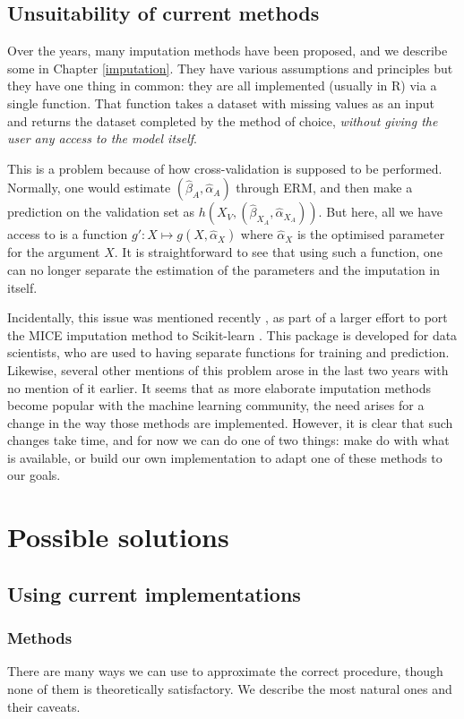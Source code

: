 \documentclass[12pt, a4paper]{memoir}
\begin{document}
		\subsection{Unsuitability of current methods}
Over the years, many imputation methods have been proposed, and we describe some in Chapter \ref{imputation}. They have various assumptions and principles but they have one thing in common: they are all implemented (usually in R) via a single function. That function takes a dataset with missing values as an input and returns the dataset completed by the method of choice, \emph{without giving the user any access to the model itself}.

This is a problem because of how cross-validation is supposed to be performed. Normally, one would estimate $(\hat{\beta}_A, \hat{\alpha}_A)$ through ERM, and then make a prediction on the validation set as $h(X_V,(\hat{\beta}_{X_A},\hat{\alpha}_{X_A}))$. But here, all we have access to is a function $g': X \mapsto g(X, \hat{\alpha}_X)$ where $\hat{\alpha}_X$ is the optimised parameter for the argument $X$. It is straightforward to see that using such a function, one can no longer separate the estimation of the parameters and the imputation in itself.
	
Incidentally, this issue was mentioned recently \cite{github_sklearn}, as part of a larger effort to port the MICE \cite{MICE_founding} imputation method to Scikit-learn \cite{scikit-learn}. This package is developed for data scientists, who are used to having separate functions for training and prediction. Likewise, several other mentions of this problem arose in the last two years \cite{thread_newdata1}\cite{thread_newdata2}\cite{thread_newdata3} with no mention of it earlier. It seems that as more elaborate imputation methods become popular with the machine learning community, the need arises for a change in the way those methods are implemented. However, it is clear that such changes take time, and for now we can do one of two things: make do with what is available, or build our own implementation to adapt one of these methods to our goals.
	\section{Possible solutions}
		\subsection{Using current implementations}
			\subsubsection{Methods}
There are many ways we can use to approximate the correct procedure, though none of them is theoretically satisfactory. We describe the most natural ones and their caveats.
\end{document}
